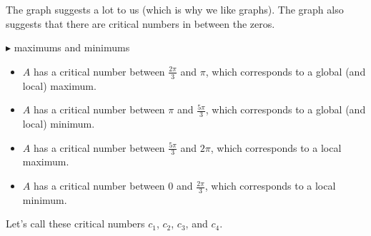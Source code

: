 \documentclass{ximera}
\begin{document}
The graph suggests a lot to us (which is why we like graphs).  The graph also suggests that there are critical numbers in between the zeros.  







$\blacktriangleright$ maximums and minimums

\begin{itemize}
\item $A$ has a critical number between $\frac{2\pi}{3}$ and $\pi$, which corresponds to a global (and local) maximum.
\item $A$ has a critical number between $\pi$ and $\frac{5\pi}{3}$, which corresponds to a global (and local) minimum.
\item $A$ has a critical number between $\frac{5\pi}{3}$ and $2\pi$, which corresponds to a local maximum.
\item $A$ has a critical number between $0$ and $\frac{2\pi}{3}$, which corresponds to a local minimum.
\end{itemize}


Let's call these critical numbers $c_1$, $c_2$, $c_3$, and $c_4$.
\end{document}
